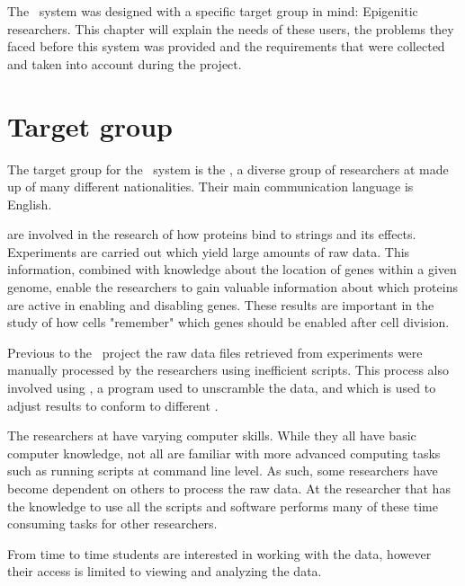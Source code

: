 
The \appName\ system was designed with a specific target group in mind: Epigenitic researchers. This chapter will explain the needs of these users, the problems they faced before this system was provided and the requirements that were collected and taken into account during the project.

\section{Target group}

The target group for the \appName\ system is  the , a diverse group of researchers at  made up of many different nationalities. Their main communication language is English.

 are involved in the research of how proteins bind to  strings and its effects. Experiments are carried out which yield large amounts of raw data. This information, combined with knowledge about the location of genes within a given genome, enable the researchers to gain valuable information about which proteins are active in enabling and disabling genes. These results are important in the study of how cells "remember" which genes should be enabled after cell division.

Previous to the \appName\ project the raw data files retrieved from experiments were manually processed by the researchers using inefficient  scripts. This process also involved using \cite{BOWTIE}, a program used to unscramble the  data, and \cite{LIFTOVER} which is used to adjust results to conform to different .

The researchers at  have varying computer skills. While they all have basic computer knowledge, not all are familiar with more advanced computing tasks such as running scripts at command line level. As such, some researchers have become dependent on others to process the raw data. At  the researcher that has the knowledge to use all the scripts and software performs many of these time consuming tasks for other researchers.

From time to time students are interested in working with the data, however their access is limited to viewing and analyzing the data. 




